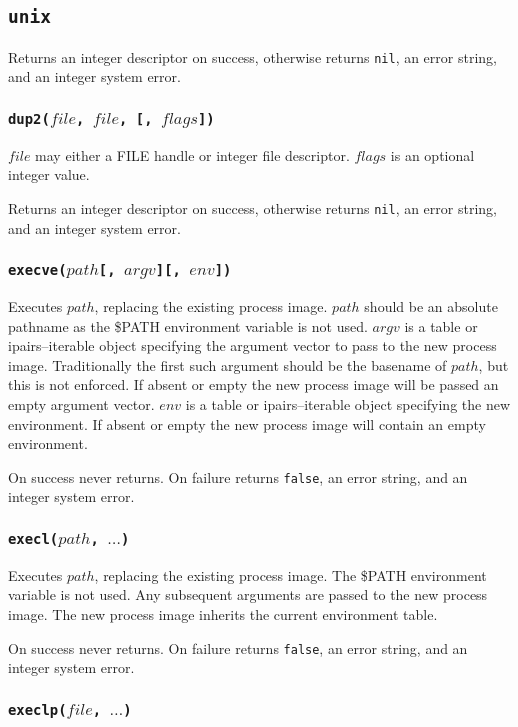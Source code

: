 \documentclass[11pt, oneside]{memoir}
\newcommand*{\false}[0]{\texttt{false}\xspace}
\newcommand*{\nil}[0]{\texttt{nil}\xspace}
\newcommand*{\fn}[1]{\texttt{#1}\xspace}
\newcounter{toccols}
\newenvironment{Module}[1]{
	\subsection{\texttt{#1}}
	\addtocontents{toc}{
		\protect\begin{multicols}{\value{toccols}}
	}
}{
	\addtocontents{toc}{\protect\end{multicols}}
}
\begin{document}
\begin{Module}{unix}
Returns an integer descriptor on success, otherwise returns \nil, an error string, and an integer system error.

\subsubsection[\fn{dup2}]{\fn{dup2($file$, $file$, [, $flags$])}}

$file$ may either a FILE handle or integer file descriptor. $flags$ is an optional integer value.

Returns an integer descriptor on success, otherwise returns \nil, an error string, and an integer system error.

\subsubsection[\fn{execve}]{\fn{execve($path$[, $argv$][, $env$])}}

Executes $path$, replacing the existing process image. $path$ should be an absolute pathname as the \$PATH environment variable is not used. $argv$ is a table or ipairs--iterable object specifying the argument vector to pass to the new process image. Traditionally the first such argument should be the basename of $path$, but this is not enforced. If absent or empty the new process image will be passed an empty argument vector. $env$ is a table or ipairs--iterable object specifying the new environment. If absent or empty the new process image will contain an empty environment.

On success never returns. On failure returns \false, an error string, and an integer system error.

\subsubsection[\fn{execl}]{\fn{execl($path$, $\ldots$)}}

Executes $path$, replacing the existing process image. The \$PATH environment variable is not used. Any subsequent arguments are passed to the new process image. The new process image inherits the current environment table.

On success never returns. On failure returns \false, an error string, and an integer system error.

\subsubsection[\fn{execlp}]{\fn{execlp($file$, $\ldots$)}}


\end{Module}
\end{document}
